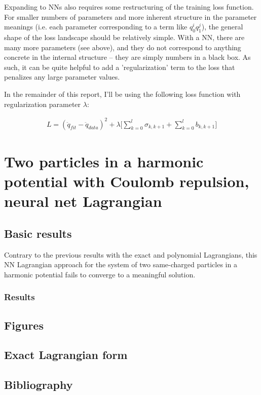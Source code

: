 \documentclass[]{article}
\begin{document}
Expanding to NNs also requires some restructuring of the training loss function.  For smaller numbers of parameters and more inherent structure in the parameter meanings (i.e. each parameter corresponding to a term like $q_0^i q_1^j$), the general shape of the loss landscape should be relatively simple. With a NN, there are many more parameters (see above), and they do not correspond to anything concrete in the internal structure -- they are simply numbers in a black box. As such, it can be quite helpful to add a 'regularization' term to the loss that penalizes any large parameter values.

In the remainder of this report, I'll be using the following loss function with regularization parameter $\lambda$:

\begin{eqnarray*}
	L = ( \ddot{q}_{fit} - \ddot{q}_{data})^2 + \lambda \Bigg[  \sum_{k=0}^{l} \sigma_{k,k+1} + \sum_{k=0}^{l} b_{k,k+1} \Bigg]
\end{eqnarray*}


\section{Two particles in a harmonic potential with Coulomb repulsion, neural net Lagrangian}
\subsection{Basic results}
Contrary to the previous results with the exact and polynomial Lagrangians, this NN Lagrangian approach for the system of two same-charged particles in a harmonic potential fails to converge to a meaningful solution. 



\subsubsection{Results}






\newpage
\begin{appendices}
\section{Figures}

\subsection{Exact Lagrangian form}











\end{appendices}



\newpage
\begin{appendices}
\section{Bibliography}
\printbibliography
\end{appendices}
\end{document}

